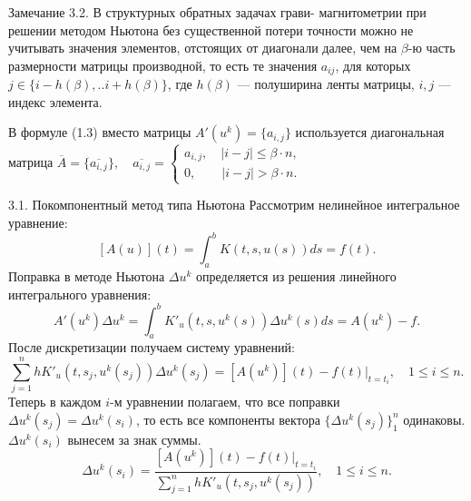 \documentclass[10pt,pdf, mathserif, hyperref={unicode}]{beamer}
\begin{document}
\begin{frame}
	\begin{block}{Замечание 3.2.}
		В структурных обратных задачах грави- магнитометрии при решении методом Ньютона без существенной потери точности можно не учитывать значения элементов, отстоящих от диагонали далее, чем на  $\beta$-ю часть  размерности матрицы производной, то есть те значения $a_{ij}$, для которых  $j \in \{i-h(\beta),..i+h(\beta)\} $, где $h(\beta)$ --- полуширина ленты матрицы, $i, j$ --- индекс элемента.
		
		В формуле (1.3) вместо матрицы $A'(u^k)=\{a_{i,j}\}$ используется диагональная матрица $\overline{A}=\{\overline{a_{i,j}}\}, \quad \overline{a_{i,j}}=
		\begin{cases}
		a_{i,j},\quad  |i-j|\leq\beta \cdot n, \\
		0, \quad \quad | i-j|>\beta \cdot n. 
		\end{cases}$
	\end{block}
	\let\thefootnote\relax\let\thefootnote\relax{}
\end{frame}

\begin{frame}{3.1. Покомпонентный метод типа Ньютона}
	Рассмотрим нелинейное интегральное уравнение:
	$$[A(u)](t)=\int_{a}^{b}K(t,s,u(s))ds=f(t).$$
Поправка в методе Ньютона $\Delta u^k$ определяется из решения линейного интегрального уравнения:
$$A'(u^k)\Delta u^k=\int_{a}^{b}K'_u(t,s,u^k(s))\Delta u^k(s)ds=A(u^k)-f.$$
После дискретизации получаем систему уравнений:
$$\sum\limits_{j=1}^{n}h K'_u(t,s_j,u^k(s_j))\Delta u^k(s_j)=[A(u^k)](t)-f(t)|_{t=t_i}, \quad 1\leqslant i\leqslant n.$$
Теперь в каждом $i$-м уравнении полагаем, что все поправки $\Delta u^k(s_j)=\Delta u^k(s_i)$, то есть все компоненты вектора $\{\Delta u^k(s_j)\}_1^n$ одинаковы. $\Delta u^k(s_i)$ вынесем за знак суммы.
$$\Delta u^k(s_i)=\frac{[A(u^k)](t)-f(t)|_{t=t_i}}{\sum\limits_{j=1}^{n}h K'_u(t,s_j,u^k(s_j))}, \quad 1\leqslant i\leqslant n.$$
\end{frame}
\end{document}
